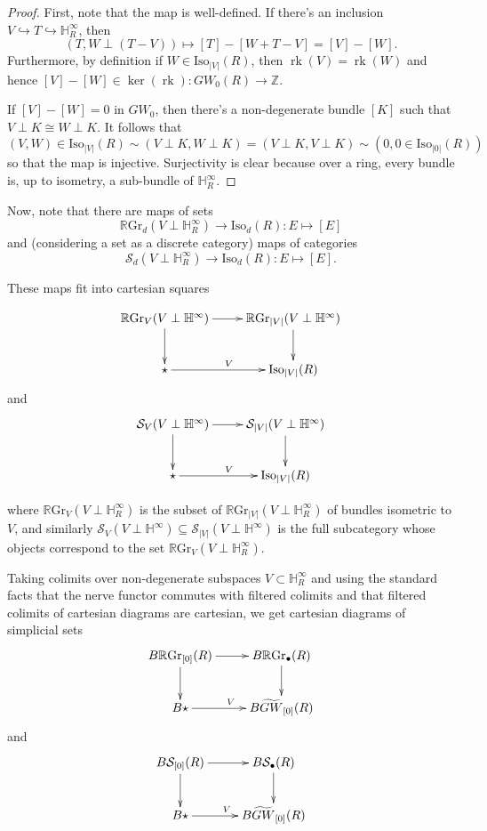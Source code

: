 \documentclass[edeposit,fullpage]{uiucthesis2009}
\newcommand{\Z}{\mathbb Z}
\newcommand{\mbb}{\mathbb}
\newcommand{\mc}{\mathcal}
\newcommand{\RGr}{\mathbb R\mathrm{Gr}}
\newcommand{\Iso}{\mathrm{Iso}}
\DeclareMathOperator{\rk}{rk}
\theoremstyle{plain}
\numberwithin{lemma}{section}
\theoremstyle{definition}
\begin{document}
\begin{proof}
First, note that the map is well-defined. If there's an inclusion $V
\hookrightarrow T \hookrightarrow \mbb H^\infty_R$, then 
\[
(T,W \perp (T-V)) \mapsto [T] - [W + T - V] = [V] - [W].
\]
Furthermore, by definition if $W \in \Iso_{|V|}(R)$, then $\rk(V) =
\rk(W)$ and hence $[V]-[W] \in \ker(\rk) : GW_0(R) \rightarrow \Z$. 

If $[V] - [W] = 0$ in $GW_0$, then there's a non-degenerate bundle
$[K]$ such that $V \perp K \cong W \perp K$. It follows that $(V,W) \in
\Iso_{|V|}(R) \sim (V \perp K, W \perp K) = (V \perp K, V \perp K)
\sim (0,0\in \Iso_{|0|}(R))$ so that the map is
injective. Surjectivity is clear because over a ring, every bundle is,
up to isometry, a sub-bundle of $\mbb H^\infty_R$.
\end{proof}

Now, note that there are maps of sets
\[
\RGr_d(V \perp \mbb H^\infty_R) \rightarrow \Iso_d(R): E \mapsto [E]
\]
and (considering a set as a discrete category) maps of categories
\[
\mc S_d(V \perp \mbb H^\infty_R) \rightarrow \Iso_d(R) : E \mapsto [E].
\]

These maps fit into cartesian squares

\[
\xymatrix{\RGr_V(V \perp \mbb H^\infty) \ar[r]\ar[d] & \RGr_{|V|}(V
  \perp \mbb H^\infty) \ar[d] \\ \star \ar[r]^V & \Iso_{|V|}(R)}
\]
and 
\[
\xymatrix{\mc S_V(V \perp \mbb H^\infty) \ar[r]\ar[d] & \mc S_{|V|}(V
  \perp \mbb H^\infty) \ar[d] \\ \star \ar[r]^V & \Iso_{|V|}(R)}
\]

where $\RGr_V(V \perp \mbb H^\infty_R)$ is the subset of $\RGr_{|V|}(V
\perp \mbb H^\infty_R)$ of bundles isometric to $V$, and similarly
$\mc S_V(V \perp \mbb H^\infty) \subseteq \mc S_{|V|}(V \perp \mbb H^\infty)$ is the full subcategory whose objects
correspond to the set $\RGr_V(V \perp \mbb H^\infty_R)$.

Taking colimits over non-degenerate subspaces $V \subset \mbb
H^\infty_R$ and using the standard facts that the nerve functor commutes with filtered colimits and
that filtered colimits of cartesian diagrams are cartesian, we get cartesian diagrams of simplicial sets
\[
\xymatrix{B\RGr_{[0]}(R) \ar[r]\ar[d] & B\RGr_\bullet(R) \ar[d] \\ B\star \ar[r]^V & B\widetilde{GW}_{[0]}(R)}
\]
and 
\[
\xymatrix{B\mc S_{[0]}(R) \ar[r]\ar[d] & B\mc S_\bullet(R) \ar[d] \\ B\star \ar[r]^V & B\widetilde{GW}_{[0]}(R)}
\]
\end{document}
